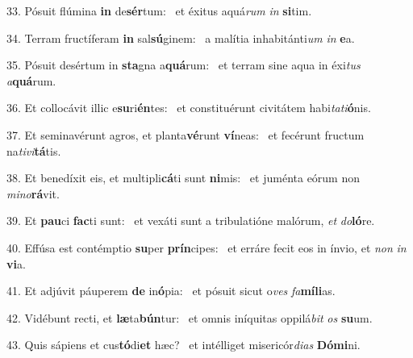 33. Pósuit flúmina \textbf{in} de\textbf{sér}tum: \ast\  et éxitus aquá\textit{rum} \textit{in} \textbf{si}tim.\

34. Terram fructíferam \textbf{in} sal\textbf{sú}ginem: \ast\  a malítia inhabitánti\textit{um} \textit{in} \textbf{e}a.\

35. Pósuit desértum in \textbf{sta}gna a\textbf{quá}rum: \ast\  et terram sine aqua in éxi\textit{tus} \textit{a}\textbf{quá}rum.\

36. Et collocávit illic e\textbf{su}ri\textbf{én}tes: \ast\  et constituérunt civitátem habi\textit{ta}\textit{ti}\textbf{ó}nis.\

37. Et seminavérunt agros, et planta\textbf{vé}runt \textbf{ví}neas: \ast\  et fecérunt fructum na\textit{ti}\textit{vi}\textbf{tá}tis.\

38. Et benedíxit eis, et multipli\textbf{cá}ti sunt \textbf{ni}mis: \ast\  et juménta eórum non \textit{mi}\textit{no}\textbf{rá}vit.\

39. Et \textbf{pau}ci \textbf{fac}ti sunt: \ast\  et vexáti sunt a tribulatióne malórum, \textit{et} \textit{do}\textbf{ló}re.\

40. Effúsa est contémptio \textbf{su}per \textbf{prín}cipes: \ast\  et erráre fecit eos in ínvio, et \textit{non} \textit{in} \textbf{vi}a.\

41. Et adjúvit páuperem \textbf{de} in\textbf{ó}pia: \ast\  et pósuit sicut o\textit{ves} \textit{fa}\textbf{mí}\textbf{li}as.\

42. Vidébunt recti, et \textbf{læ}ta\textbf{bún}tur: \ast\  et omnis iníquitas oppilá\textit{bit} \textit{os} \textbf{su}um.\

43. Quis sápiens et cus\textbf{tó}di\textbf{et} hæc? \ast\  et intélliget misericór\textit{di}\textit{as} \textbf{Dó}\textbf{mi}ni.\

